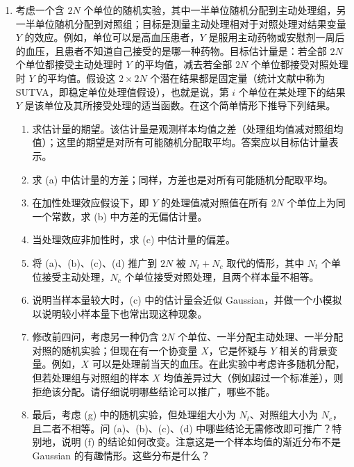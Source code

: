 \documentclass[UTF8,12pt]{ctexart}
\begin{document}
\begin{enumerate}[label=\textbf{\arabic*)},leftmargin=2.2em]
\item 考虑一个含 \(2N\) 个单位的随机实验，其中一半单位随机分配到主动处理组，另一半单位随机分配到对照组；目标是测量主动处理相对于对照处理对结果变量 \(Y\) 的效应。例如，单位可以是高血压患者，\(Y\) 是服用主动药物或安慰剂一周后的血压，且患者不知道自己接受的是哪一种药物。目标估计量是：若全部 \(2N\) 个单位都接受主动处理时 \(Y\) 的平均值，减去若全部 \(2N\) 个单位都接受对照处理时 \(Y\) 的平均值。假设这 \(2\times2N\) 个潜在结果都是固定量（统计文献中称为 SUTVA，即稳定单位处理值假设），也就是说，第 \(i\) 个单位在某处理下的结果 \(Y\) 是该单位及其所接受处理的适当函数。在这个简单情形下推导下列结果。
\begin{enumerate}[label=\textbf{(\alph*)},leftmargin=2.4em]
\item 求估计量的期望。该估计量是观测样本均值之差（处理组均值减对照组均值）；这里的期望是对所有可能随机分配取平均。答案应以目标估计量表示。
\item 求 (a) 中估计量的方差；同样，方差也是对所有可能随机分配取平均。
\item 在加性处理效应假设下，即 \(Y\) 的处理值减对照值在所有 \(2N\) 个单位上为同一个常数，求 (b) 中方差的无偏估计量。
\item 当处理效应非加性时，求 (c) 中估计量的偏差。
\item 将 (a)、(b)、(c)、(d) 推广到 \(2N\) 被 \(N_t+N_c\) 取代的情形，其中 \(N_t\) 个单位接受主动处理，\(N_c\) 个单位接受对照处理，且两个样本量不相等。
\item 说明当样本量较大时，(c) 中的估计量会近似 Gaussian，并做一个小模拟以说明较小样本量下也常出现这种现象。
\item 修改前四问，考虑另一种仍含 \(2N\) 个单位、一半分配主动处理、一半分配对照的随机实验；但现在有一个协变量 \(X\)，它是怀疑与 \(Y\) 相关的背景变量。例如，\(X\) 可以是处理前当天的血压。在此实验中考虑许多随机分配，但若处理组与对照组的样本 \(X\) 均值差异过大（例如超过一个标准差），则拒绝该分配。请仔细说明哪些结论可以推广，哪些不能。
\item 最后，考虑 (g) 中的随机实验，但处理组大小为 \(N_t\)、对照组大小为 \(N_c\)，且二者不相等。问 (a)、(b)、(c)、(d) 中哪些结论无需修改即可推广？特别地，说明 (f) 的结论如何改变。注意这是一个样本均值的渐近分布不是 Gaussian 的有趣情形。这些分布是什么？
\end{enumerate}
\end{enumerate}
\end{document}
